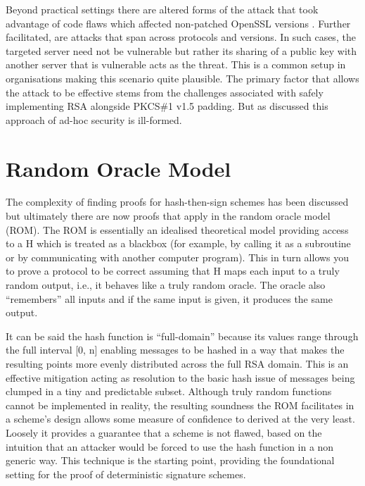 \documentclass[]{final_report}
\theoremstyle{definition}
\begin{document}
Beyond practical settings there are altered forms of the attack that took advantage of code flaws which affected non-patched OpenSSL versions \cite{CVE-2006-4339}. Further facilitated, are attacks that span across protocols and versions. In such cases, the targeted server need not be vulnerable but rather its sharing of a public key with another server that is vulnerable acts as the threat. This is a common setup in organisations making this scenario quite plausible. The primary factor that allows the attack to be effective stems from the challenges associated with safely implementing RSA alongside PKCS\#1 v1.5 padding. But as discussed this approach of ad-hoc security is ill-formed. 

\section{Random Oracle Model}
\label{subSec:ROM}
The complexity of finding proofs for hash-then-sign schemes has been discussed but ultimately there are now proofs that apply in the random oracle model (ROM). The ROM is essentially an idealised theoretical model providing access to a H which is treated as a blackbox (for example, by calling it as a subroutine or by communicating with another computer program). This in turn allows you to prove a protocol to be correct assuming that H maps each input to a truly random output, i.e., it behaves like a truly random oracle. 
The oracle also “remembers” all inputs and if the same input is given, it produces the same output. 

It can be said the hash function is “full-domain” because its values range through the full interval [0, n] enabling messages to be hashed in a way that makes the resulting points more evenly distributed across the full RSA domain. This is an effective mitigation acting as resolution to the basic hash issue of messages being clumped in a tiny and predictable subset. 
Although truly random functions cannot be implemented in reality, the resulting soundness the ROM facilitates in a scheme’s design allows some measure of confidence to derived at the very least. Loosely it provides a guarantee that a scheme is not flawed, based on the intuition that an attacker would be forced to use the hash function in a non generic way. This technique is the starting point, providing the foundational setting for the proof of deterministic signature schemes.
\end{document}
